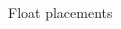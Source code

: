 \documentclass[,aspectratio=43]{beamer}
\begin{document}
\begin{frame}{Float placements}
\begin{columns}[T]
\begin{column}{0.33\textwidth}
\begin{figure}
\end{figure}
\end{column}
\end{columns}
\end{frame}
\end{document}
